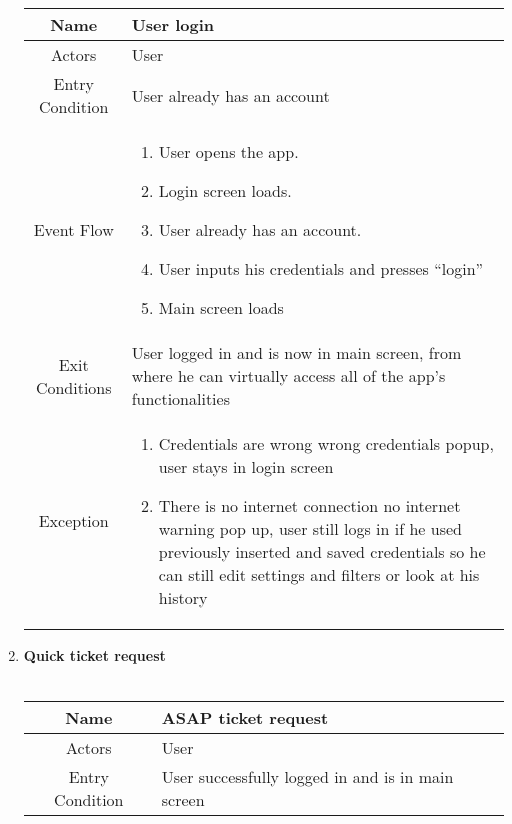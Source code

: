 \begin{enumerate}
\begin{table}[H]
{
	\begin{tabular}{|c|p{14cm}|}
		\hline
		Name & User login\\
		\hline
		Actors & User\\
		\hline
		Entry Condition & User already has an account\\
		\hline
		Event Flow & \begin{enumerate}
			\item User opens the app.
			\item Login screen loads.
			\item User already has an account.
			\item User inputs his credentials and presses “login”
			\item Main screen loads
		\end{enumerate}\\
		\hline
		Exit Conditions & User logged in and is now in main screen, from where he can virtually access all of the app’s functionalities\\
		\hline
		Exception & \begin{enumerate}
			\item Credentials are wrong\newline
			wrong credentials popup, user stays in  login screen
			
			\item There is no internet connection\newline
			no internet warning pop up, user still logs in if he used previously inserted and saved credentials so he can still edit settings and filters or look at his history 
			
		\end{enumerate}\\
		
		\hline
	\end{tabular}
}
\end{table}

\item \textbf{Quick ticket request}\\\\
	
\begin{table}[H]
{
	\begin{tabular}{|c|p{14cm}|}
		\hline
		Name & ASAP ticket request\\
		\hline
		Actors & User\\
		\hline
		Entry Condition & User successfully logged in and is in main screen\\
		\hline
		

\end{tabular}}
\end{table}
\end{enumerate}
